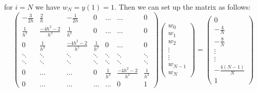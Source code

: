 \documentclass{article}
\begin{document}
\begin{itemize}
    for $i=N$ we have $w_N=y(1)=1$. Then we can set up the matrix as follows: \[\begin{pmatrix}
        -\frac{3}{2h}&\frac{2}{h}&-\frac{1}{2h}&0&\ldots&\ldots&0\\
        \frac{1}{h^2}&\frac{-4h^2-2}{h^2}&\frac{1}{h^2}&0&\ldots&\ldots&0\\
        0&\frac{1}{h^2}&\frac{-4h^2-2}{h^2}&\frac{1}{h^2}&0&\ldots&0\\
        \ddots&\ddots&\ddots&\ddots&\ddots&\ddots&\ddots\\
        \ddots&\ddots&\ddots&\ddots&\ddots&\ddots&\ddots\\
        0&\ldots&\ldots&0&\frac{1}{h^2}&\frac{-4h^2-2}{h^2}&\frac{1}{h^2}\\
        0&\ldots&\ldots&\ldots&\ldots&0&1
    \end{pmatrix}\begin{pmatrix}
        w_0\\w_1\\w_2\\\vdots\\\vdots\\w_{N-1}\\w_N
    \end{pmatrix}=\begin{pmatrix}
        0\\-\frac{4}{N}\\-\frac{8}{N}\\\vdots\\\vdots\\-\frac{4(N-1)}{N}\\1
    \end{pmatrix}\]
\end{itemize}
\end{document}
